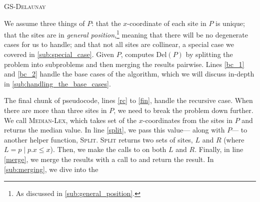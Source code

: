 \documentclass[12pt,twoside]{reedthesis}
\makeatletter
\let\OldStatex\Statex
\renewcommand{\Statex}[1][3]{%
  \setlength\@tempdima{\algorithmicindent}%
  \OldStatex\hskip\dimexpr#1\@tempdima\relax}
\makeatother
\begin{document}
    \begin{algorithm}[H]
    \caption{\textsc{GS-Delaunay}}\label{divconq_del}
    \end{algorithm}

    We assume three things of $P$: that the $x$-coordinate of each site in $P$ is unique; that the sites are in \emph{general position},\footnote{As discussed in \cref{sub:general_position}.} meaning that there will be no degenerate cases for us to handle; and that not all sites are collinear, a special case we covered in \cref{sub:special_case}. Given $P$,  computes $\mbox{Del}(P)$ by splitting the problem into subproblems and then merging the results pairwise. Lines \ref{bc_1} and \ref{bc_2} handle the base cases of the algorithm, which we will discuss in-depth in \cref{sub:handling_the_base_cases}. \par

    The final chunk of pseudocode, lines \ref{rc} to \ref{fin}, handle the recursive case. When there are more than three sites in $P$, we need to break the problem down further. We call \textsc{Median-Lex}, which takes set of the $x$-coordinates from the sites in $P$ and returns the median value. In line \ref{split}, we pass this value--- along with $P$--- to another helper function, \textsc{Split}. \textsc{Split} returns two sets of sites, $L$ and $R$ (where $L = {p \mid p.x \leq x}$). Then, we make the calls to  on both $L$ and $R$. Finally, in line \ref{merge}, we merge the results with a call to  and return the result. In \cref{sub:merging}, we dive into the \par
\end{document}
